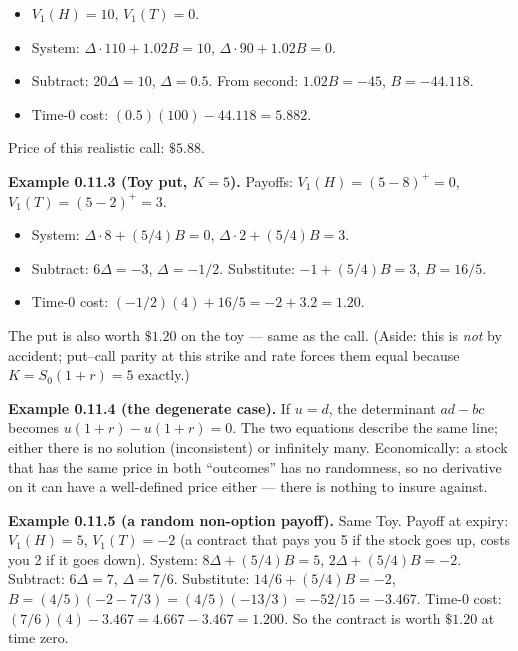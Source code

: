 \documentclass[
  10pt,
  twoside]{book}
\providecommand{\tightlist}{%
  \setlength{\itemsep}{0pt}\setlength{\parskip}{0pt}}
\begin{document}
\begin{itemize}
\tightlist
\item
  \(V_1(H) = 10\), \(V_1(T) = 0\).
\item
  System: \(\Delta \cdot 110 + 1.02 B = 10\),
  \(\Delta \cdot 90 + 1.02 B = 0\).
\item
  Subtract: \(20 \Delta = 10\), \(\Delta = 0.5\). From second:
  \(1.02 B = -45\), \(B = -44.118\).
\item
  Time-0 cost: \((0.5)(100) - 44.118 = 5.882\).
\end{itemize}

Price of this realistic call: \(\$5.88\).

\textbf{Example 0.11.3 (Toy put, \(K = 5\)).} Payoffs:
\(V_1(H) = (5 - 8)^+ = 0\), \(V_1(T) = (5 - 2)^+ = 3\).

\begin{itemize}
\tightlist
\item
  System: \(\Delta \cdot 8 + (5/4) B = 0\),
  \(\Delta \cdot 2 + (5/4) B = 3\).
\item
  Subtract: \(6 \Delta = -3\), \(\Delta = -1/2\). Substitute:
  \(-1 + (5/4) B = 3\), \(B = 16/5\).
\item
  Time-0 cost: \((-1/2)(4) + 16/5 = -2 + 3.2 = 1.20\).
\end{itemize}

The put is also worth \(\$1.20\) on the toy --- same as the call.
(Aside: this is \emph{not} by accident; put--call parity at this strike
and rate forces them equal because \(K = S_0(1 + r) = 5\) exactly.)

\textbf{Example 0.11.4 (the degenerate case).} If \(u = d\), the
determinant \(ad - bc\) becomes \(u(1+r) - u(1+r) = 0\). The two
equations describe the same line; either there is no solution
(inconsistent) or infinitely many. Economically: a stock that has the
same price in both ``outcomes'' has no randomness, so no derivative on
it can have a well-defined price either --- there is nothing to insure
against.

\textbf{Example 0.11.5 (a random non-option payoff).} Same Toy. Payoff
at expiry: \(V_1(H) = 5\), \(V_1(T) = -2\) (a contract that pays you 5
if the stock goes up, costs you 2 if it goes down). System:
\(8 \Delta + (5/4) B = 5\), \(2 \Delta + (5/4) B = -2\). Subtract:
\(6\Delta = 7\), \(\Delta = 7/6\). Substitute: \(14/6 + (5/4) B = -2\),
\(B = (4/5)(-2 - 7/3) = (4/5)(-13/3) = -52/15 = -3.467\). Time-0 cost:
\((7/6)(4) - 3.467 = 4.667 - 3.467 = 1.200\). So the contract is worth
\(\$1.20\) at time zero.
\end{document}
